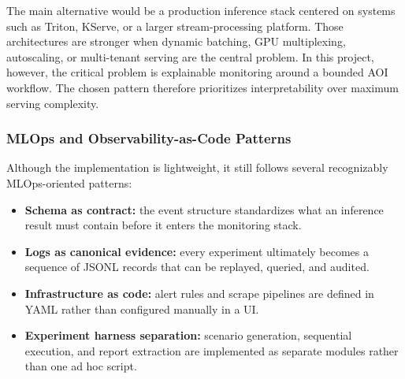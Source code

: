 \documentclass[12pt,a4paper]{article}
\begin{document}
The main alternative would be a production inference stack centered on systems
such as Triton, KServe, or a larger stream-processing platform. Those
architectures are stronger when dynamic batching, GPU multiplexing, autoscaling,
or multi-tenant serving are the central problem. In this project, however, the
critical problem is explainable monitoring around a bounded AOI workflow. The
chosen pattern therefore prioritizes interpretability over maximum serving
complexity.

\subsubsection{MLOps and Observability-as-Code Patterns}
Although the implementation is lightweight, it still follows several recognizably
MLOps-oriented patterns:
\begin{itemize}
    \item \textbf{Schema as contract:} the event structure standardizes what an
    inference result must contain before it enters the monitoring stack.
    \item \textbf{Logs as canonical evidence:} every experiment ultimately
    becomes a sequence of JSONL records that can be replayed, queried, and
    audited.
    \item \textbf{Infrastructure as code:} alert rules and scrape pipelines are
    defined in YAML rather than configured manually in a UI.
    \item \textbf{Experiment harness separation:} scenario generation,
    sequential execution, and report extraction are implemented as separate
    modules rather than one ad hoc script.
\end{itemize}
\end{document}
